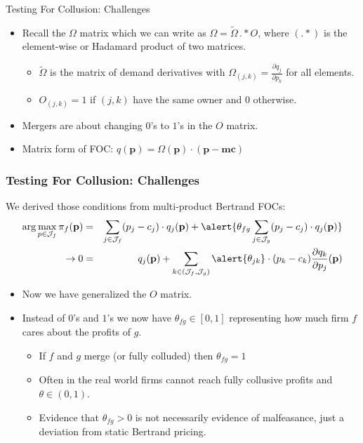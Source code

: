 \documentclass[xcolor=pdftex,dvipsnames,table,mathserif]{beamer}
\begin{document}
\begin{frame}{Testing For Collusion: Challenges}
\begin{itemize}
\item Recall the $\Omega$ matrix which we can write as $\Omega=\tilde{\Omega}\, .* O$, where $(.*)$ is the element-wise or Hadamard product of two matrices. 
\begin{itemize}
\item $\tilde{\Omega}$ is the matrix of demand derivatives with $\Omega_{(j,k)} = \frac{\partial q_j}{\partial p_k}$ for all elements.
\item $O_{(j,k)} =1$ if $(j,k)$ have the same owner and $0$ otherwise.
\end{itemize}
\item Mergers are about changing $0$'s to $1$'s in the $O$ matrix.
\item Matrix form of FOC: $q(\mathbf{p}) = \Omega(\mathbf{p})\cdot(\mathbf{p}-\mathbf{mc})$
\end{itemize}
\end{frame}

\begin{frame}
\frametitle{Testing For Collusion: Challenges}
We derived those conditions from multi-product Bertrand FOCs:
\begin{eqnarray*}
\arg \max_{p \in \mathcal{J}_f} \pi_f (\mathbf{p}) &=& \sum_{j \in \mathcal{J}_f} (p_j - c_j) \cdot q_j(\mathbf{p}) +  \alert{\theta_{fg} \sum_{j \in \mathcal{J}_g} (p_j - c_j) \cdot q_j(\mathbf{p})} \\
\rightarrow 0&=& q_j(\mathbf{p}) + \sum_{k \in (\mathcal{J}_f,\mathcal{J}_g)} \alert{\theta_{jk}}\cdot (p_k - c_k) \frac{\partial q_{k}}{\partial p_j}(\mathbf{p}) 
\end{eqnarray*}
\begin{itemize}
\item Now we have generalized the $O$ matrix.
\item Instead of $0$'s and $1$'s we now have $\theta_{fg} \in [0,1]$ representing how much firm $f$ cares about the profits of $g$.
\begin{itemize}
\item If $f$ and $g$ merge (or fully colluded) then $\theta_{fg} =1$
\item Often in the real world firms cannot reach fully collusive profits and $\theta \in (0,1)$.
\item Evidence that $\theta_{fg} > 0$ is not necessarily evidence of malfeasance, just a deviation from \alert{static Bertrand pricing}.
\end{itemize}
\end{itemize}
\end{frame}
\end{document}
